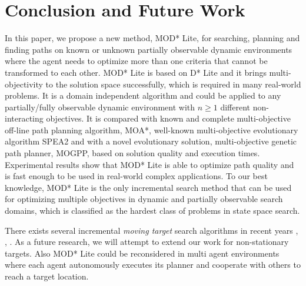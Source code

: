 \documentclass[10pt,journal]{IEEEtran}
\begin{document}
\section{Conclusion and Future Work}
\label{chapter:conclusion}


In this paper, we propose a new method, MOD* Lite, for searching, planning and finding paths on known or unknown partially observable dynamic environments  where the agent needs to optimize more than one criteria that cannot be transformed to each other.  MOD* Lite is based on D* Lite and it brings multi-objectivity to the solution space successfully, which is required in many real-world problems. It is a domain independent algorithm and could be applied to any partially/fully observable dynamic environment with $n \ge 1$ different non-interacting objectives. It is compared with known and complete multi-objective off-line path planning algorithm, MOA*, well-known multi-objective evolutionary algorithm SPEA2 and with a novel evolutionary solution, multi-objective genetic path planner, MOGPP, based on solution quality and execution times. Experimental results show that MOD* Lite is able to optimize path quality and is fast enough to be used in real-world complex applications. To our best knowledge, MOD* Lite is the only incremental search method that can be used for optimizing multiple objectives in dynamic and partially observable search domains, which is classified as the hardest class of problems in state space search.

There exists several incremental {\it moving target} search algorithms in recent years \cite{Sun:2009}, \cite{GFR-A*Sun:2010}, \cite{MT-D*Lite:2010}. As a future research, we will attempt to extend our work for non-stationary targets. Also MOD* Lite could be reconsidered in multi agent environments where each agent autonomously executes its planner and cooperate with others to reach a target location. 
\end{document}
